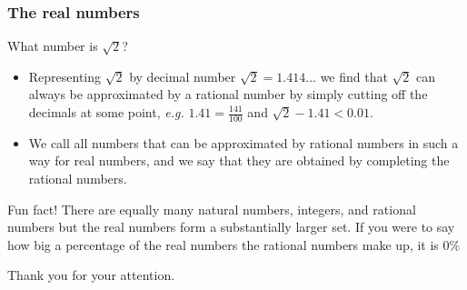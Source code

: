 \documentclass{beamer}[10]
\begin{document}
\begin{frame}
	\frametitle{The real numbers}
	\begin{block}{What number is $ \sqrt{2} $?}
		\begin{itemize}
			\item Representing $ \sqrt{2} $ by decimal number $ \sqrt{2}=1.414... $ we find that $ \sqrt{2} $ can always be approximated by a rational number by simply cutting off the decimals at some point, \emph{e.g.} $ 1.41=\frac{141}{100} $ and $ \sqrt{2}-1.41<0.01 $.
			\item We call all numbers that can be approximated by rational numbers in such a way for real numbers, and we say that they are obtained by completing the rational numbers.
		\end{itemize}	
	\end{block}
	\begin{block}{Fun fact!}
		There are equally many natural numbers, integers, and rational numbers but the real numbers form a substantially larger set. If you were to say how big a percentage of the real numbers the rational numbers make up, it is $ 0\% $
	\end{block}
\end{frame}
\begin{frame}
	\centering
	\Large Thank you for your attention.\\
\end{frame}		
\end{document}
